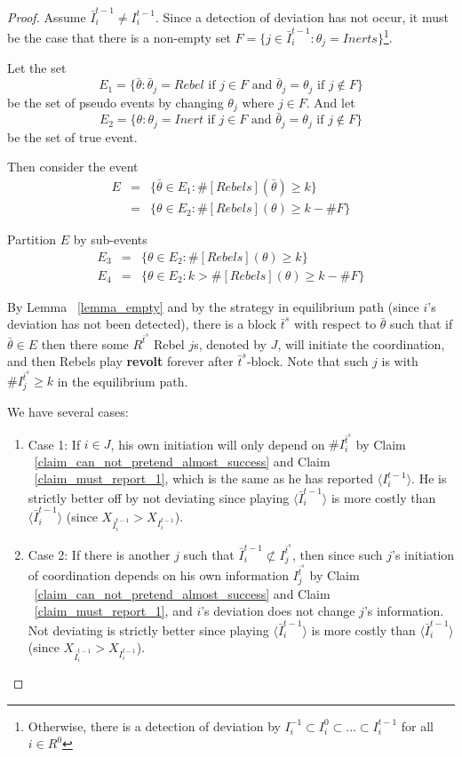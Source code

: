 \documentclass[12pt,letterpaper]{article}
\theoremstyle{definition}
\theoremstyle{remark}
\theoremstyle{claim}
\begin{document}
\begin{proof}
Assume $\bar{I}^{t-1}_i\neq I^{t-1}_i$. Since a detection of deviation has not occur, it must be the case that there is a non-empty set $F=\{j\in \bar{I}^{t-1}_i:\theta_j=Inerts\}$\footnote{Otherwise, there is a detection of deviation by $I^{-1}_i\subset I^{0}_i\subset...\subset I^{t-1}_i$ for all $i\in R^0$}. 


Let the set 
\[E_1=\{\bar{\theta}: \bar{\theta}_j=Rebel \text{ if } j\in F \text { and }\bar{\theta}_j=\theta_j \text{ if } j\notin F\}\]
be the set of pseudo events by changing $\theta_j$ where $j\in F$. And let
\[E_2=\{\theta: \theta_j=Inert \text{ if }j\in F \text { and }\bar{\theta}_j=\theta_j \text{ if } j\notin F\}\]
be the set of true event.

Then consider the event
\begin{eqnarray*}
E 	&= &\{\bar{\theta}\in E_1: \#[Rebels](\bar{\theta})\geq k\}\\
 	&= &\{\theta\in E_2: \#[Rebels](\theta)\geq k-\#F\}
\end{eqnarray*}

Partition $E$ by sub-events
\begin{eqnarray*}
E_3 	&= &\{\theta\in E_2: \#[Rebels](\theta)\geq k\}\\
E_4 	&= &\{\theta\in E_2: k>\#[Rebels](\theta)\geq k-\#F\}
\end{eqnarray*}

By Lemma ~\ref{lemma_empty} and by the strategy in equilibrium path (since $i$'s deviation has not been detected), there is a block $\bar{t}^{s}$ with respect to $\bar{\theta}$ such that if $\bar{\theta}\in E$ then there some $R^{\bar{t}^s}$ Rebel $j$s, denoted by $J$, will initiate the coordination, and then Rebels play \textbf{revolt} forever after $\bar{t}^s$-block. Note that such $j$ is with $\# {I}^{\bar{t}^{s}}_j \geq k$ in the equilibrium path.

We have several cases:
\begin{enumerate}
\item Case 1: If $i\in J$, his own initiation will only depend on $\# I^{\bar{t}^s}_i$ by Claim ~\ref{claim_can_not_pretend_almost_success} and Claim ~\ref{claim_must_report_1}, which is the same as he has reported $\langle {I}^{t-1}_i\rangle$. He is strictly better off by not deviating since playing $\langle\bar{I}^{t-1}_i\rangle$ is more costly than $\langle\bar{I}^{t-1}_i\rangle$ (since $X_{\bar{I}^{t-1}_i}>X_{I^{t-1}_i}$).

\item Case 2: If there is another $j$ such that $\bar{I}^{t-1}_i\not\subset I^{\bar{t}^{s}}_j$, then since such $j$'s initiation of coordination depends on his own information $I^{\bar{t}^{s}}_j$ by Claim ~\ref{claim_can_not_pretend_almost_success} and Claim ~\ref{claim_must_report_1}, and $i$'s deviation does not change $j$'s information. Not deviating is strictly better since playing $\langle\bar{I}^{t-1}_i\rangle$ is more costly than $\langle\bar{I}^{t-1}_i\rangle$ (since $X_{\bar{I}^{t-1}_i}>X_{I^{t-1}_i}$).


\end{enumerate}
\end{proof}
\end{document}

